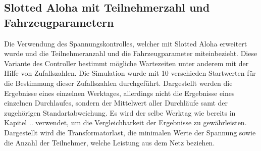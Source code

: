 \subsection{Slotted Aloha mit Teilnehmerzahl und Fahrzeugparametern}
\label{chap_SAwt}
Die Verwendung des Spannungskontrolles, welcher mit Slotted Aloha erweitert wurde und die Teilnehmeranzahl und die Fahrzeugparameter miteinbezieht. Diese Variante des Controller bestimmt mögliche Wartezeiten unter anderem mit der Hilfe von Zufallszahlen. Die Simulation wurde mit 10 verschieden Startwerten für die Bestimmung dieser Zufallszahlen durchgeführt. Dargestellt werden die Ergebnisse eines einzelnen Werktages, allerdings nicht die Ergebnisse eines einzelnen Durchlaufes, sondern der Mittelwert aller Durchläufe samt der zugehörigen Standartabweichung. Es wird der selbe Werktag wie bereits in Kapitel .. verwendet, um die Vergleichbarkeit der Ergebnisse zu gewährleisten. Dargestellt wird die Transformatorlast, die minimalen Werte der Spannung sowie die Anzahl der Teilnehmer, welche Leistung aus dem Netz beziehen. 

